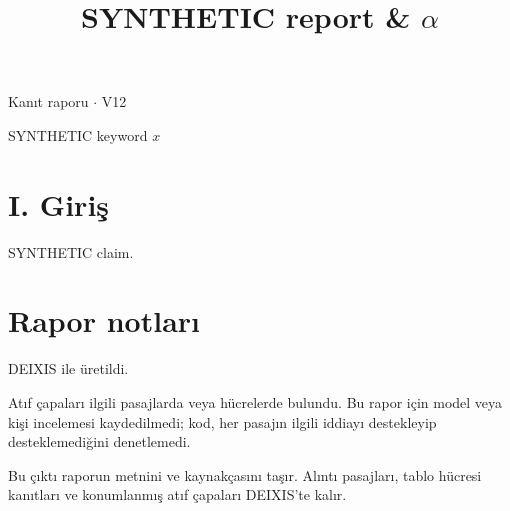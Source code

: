\documentclass[journal]{IEEEtran}
\begin{document}
\renewcommand{\abstractname}{Özet}
\renewcommand{\IEEEkeywordsname}{Dizin Terimleri}
\renewcommand{\refname}{Kaynaklar}

\title{SYNTHETIC report \& \ensuremath{\alpha}}

\maketitle

\noindent Kanıt raporu \ensuremath{\cdot} V12

\begin{IEEEkeywords}

SYNTHETIC keyword $x$ \cite{Synth26}

\end{IEEEkeywords}

\section*{I. Giriş}

SYNTHETIC claim. \cite{Synth26}

\section*{Rapor notları}

DEIXIS ile üretildi.

Atıf çapaları ilgili pasajlarda veya hücrelerde bulundu. Bu rapor için model veya kişi incelemesi kaydedilmedi; kod, her pasajın ilgili iddiayı destekleyip desteklemediğini denetlemedi.

Bu çıktı raporun metnini ve kaynakçasını taşır. Alıntı pasajları, tablo hücresi kanıtları ve konumlanmış atıf çapaları DEIXIS'te kalır.




\end{document}
